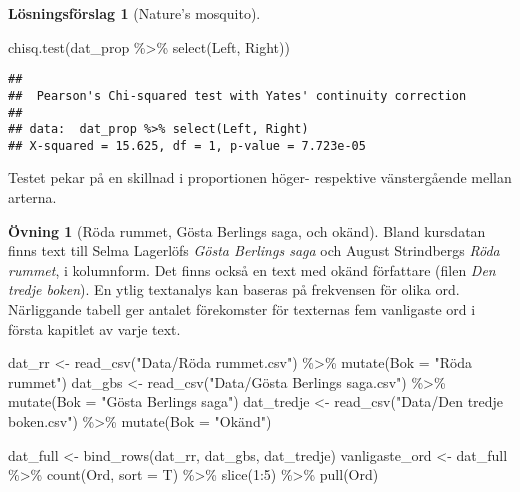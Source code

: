\documentclass[
]{book}
\newenvironment{Shaded}{\begin{snugshade}}{\end{snugshade}}
\newcommand{\AttributeTok}[1]{\textcolor[rgb]{0.77,0.63,0.00}{#1}}
\newcommand{\DecValTok}[1]{\textcolor[rgb]{0.00,0.00,0.81}{#1}}
\newcommand{\FunctionTok}[1]{\textcolor[rgb]{0.00,0.00,0.00}{#1}}
\newcommand{\NormalTok}[1]{#1}
\newcommand{\OtherTok}[1]{\textcolor[rgb]{0.56,0.35,0.01}{#1}}
\newcommand{\SpecialCharTok}[1]{\textcolor[rgb]{0.00,0.00,0.00}{#1}}
\newcommand{\StringTok}[1]{\textcolor[rgb]{0.31,0.60,0.02}{#1}}
\theoremstyle{definition}
\theoremstyle{definition}
\theoremstyle{definition}
\newtheorem{exercise}{Övning}[chapter]
\theoremstyle{definition}
\newtheorem{hypothesis}{Lösningsförslag}[chapter]
\theoremstyle{remark}
\begin{document}
\begin{hypothesis}[Nature's mosquito]
\begin{Shaded}
\begin{Highlighting}[]
\FunctionTok{chisq.test}\NormalTok{(dat\_prop }\SpecialCharTok{\%\textgreater{}\%} \FunctionTok{select}\NormalTok{(Left, Right))}
\end{Highlighting}
\end{Shaded}

\begin{verbatim}
## 
##  Pearson's Chi-squared test with Yates' continuity correction
## 
## data:  dat_prop %>% select(Left, Right)
## X-squared = 15.625, df = 1, p-value = 7.723e-05
\end{verbatim}

Testet pekar på en skillnad i proportionen höger- respektive vänstergående mellan arterna.
\end{hypothesis}

\begin{exercise}[Röda rummet, Gösta Berlings saga, och okänd]
Bland kursdatan finns text till Selma Lagerlöfs \emph{Gösta Berlings saga} och August Strindbergs \emph{Röda rummet}, i kolumnform. Det finns också en text med okänd författare (filen \emph{Den tredje boken}). En ytlig textanalys kan baseras på frekvensen för olika ord. Närliggande tabell ger antalet förekomster för texternas fem vanligaste ord i första kapitlet av varje text.

\begin{Shaded}
\begin{Highlighting}[]
\NormalTok{dat\_rr }\OtherTok{\textless{}{-}} \FunctionTok{read\_csv}\NormalTok{(}\StringTok{"Data/Röda rummet.csv"}\NormalTok{) }\SpecialCharTok{\%\textgreater{}\%} 
  \FunctionTok{mutate}\NormalTok{(}\AttributeTok{Bok =} \StringTok{"Röda rummet"}\NormalTok{)}
\NormalTok{dat\_gbs }\OtherTok{\textless{}{-}} \FunctionTok{read\_csv}\NormalTok{(}\StringTok{"Data/Gösta Berlings saga.csv"}\NormalTok{) }\SpecialCharTok{\%\textgreater{}\%} 
  \FunctionTok{mutate}\NormalTok{(}\AttributeTok{Bok =} \StringTok{"Gösta Berlings saga"}\NormalTok{)}
\NormalTok{dat\_tredje }\OtherTok{\textless{}{-}} \FunctionTok{read\_csv}\NormalTok{(}\StringTok{"Data/Den tredje boken.csv"}\NormalTok{) }\SpecialCharTok{\%\textgreater{}\%} 
  \FunctionTok{mutate}\NormalTok{(}\AttributeTok{Bok =} \StringTok{"Okänd"}\NormalTok{)}

\NormalTok{dat\_full }\OtherTok{\textless{}{-}} \FunctionTok{bind\_rows}\NormalTok{(dat\_rr, dat\_gbs, dat\_tredje)}
\NormalTok{vanligaste\_ord }\OtherTok{\textless{}{-}}\NormalTok{ dat\_full }\SpecialCharTok{\%\textgreater{}\%} 
  \FunctionTok{count}\NormalTok{(Ord, }\AttributeTok{sort =}\NormalTok{ T) }\SpecialCharTok{\%\textgreater{}\%}
  \FunctionTok{slice}\NormalTok{(}\DecValTok{1}\SpecialCharTok{:}\DecValTok{5}\NormalTok{) }\SpecialCharTok{\%\textgreater{}\%} 
  \FunctionTok{pull}\NormalTok{(Ord)}


\end{Highlighting}
\end{Shaded}
\end{exercise}
\end{document}
